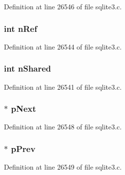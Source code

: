 Definition at line 26546 of file sqlite3.\+c.

\hypertarget{structunix_inode_info_a3c459f9ae278c22b72583c55ca01acb7}{}
\subsubsection[{n\+Ref}]{\setlength{\rightskip}{0pt plus 5cm}int n\+Ref}\label{structunix_inode_info_a3c459f9ae278c22b72583c55ca01acb7}


Definition at line 26544 of file sqlite3.\+c.

\hypertarget{structunix_inode_info_ad9aa6b43edcb95edb5edb57db88deb6e}{}
\subsubsection[{n\+Shared}]{\setlength{\rightskip}{0pt plus 5cm}int n\+Shared}\label{structunix_inode_info_ad9aa6b43edcb95edb5edb57db88deb6e}


Definition at line 26541 of file sqlite3.\+c.

\hypertarget{structunix_inode_info_ab9be30e7413abc800209febcd123d889}{}
\subsubsection[{p\+Next}]{$\ast$ p\+Next}\label{structunix_inode_info_ab9be30e7413abc800209febcd123d889}


Definition at line 26548 of file sqlite3.\+c.

\hypertarget{structunix_inode_info_a0d29ce137f0370c2b19132ab0adeb178}{}
\subsubsection[{p\+Prev}]{$\ast$ p\+Prev}\label{structunix_inode_info_a0d29ce137f0370c2b19132ab0adeb178}


Definition at line 26549 of file sqlite3.\+c.

